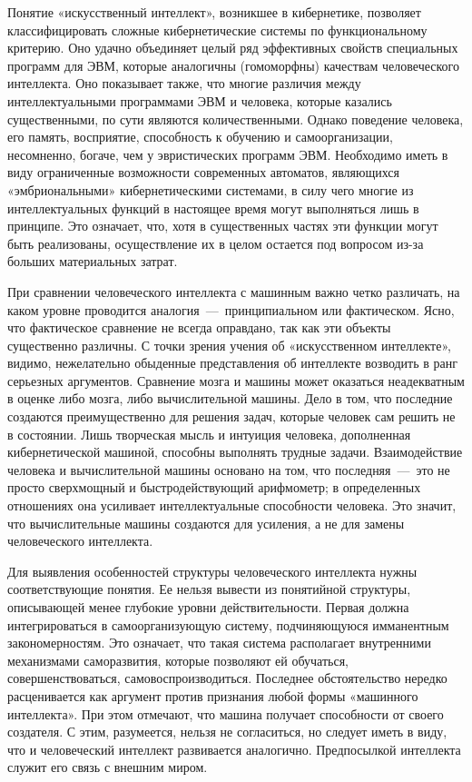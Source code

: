 \documentclass[14pt]{extarticle}
\begin{document}
Понятие «искусственный интеллект», возникшее в кибернетике, позволяет классифицировать сложные кибернетические системы по функциональному критерию. Оно удачно объединяет целый ряд эффективных свойств специальных программ для ЭВМ, которые аналогичны (гомоморфны) качествам человеческого интеллекта. Оно показывает также, что многие различия между интеллектуальными программами ЭВМ и человека, которые казались существенными, по сути являются количественными. Однако поведение человека, его память, восприятие, способность к обучению и самоорганизации, несомненно, богаче, чем у эвристических программ ЭВМ. Необходимо иметь в виду ограниченные возможности современных автоматов, являющихся «эмбриональными» кибернетическими системами, в силу чего многие из интеллектуальных функций в настоящее время могут выполняться лишь в принципе. Это означает, что, хотя в существенных частях эти функции могут быть реализованы, осуществление их в целом остается под вопросом из-за больших материальных затрат.

При сравнении человеческого интеллекта с машинным важно четко различать, на каком уровне проводится аналогия~---~принципиальном или фактическом. Ясно, что фактическое сравнение не всегда оправдано, так как эти объекты существенно различны. С точки зрения учения об «искусственном интеллекте», видимо, нежелательно обыденные представления об интеллекте возводить в ранг серьезных аргументов. Сравнение мозга и машины может оказаться неадекватным в оценке либо мозга, либо вычислительной машины. Дело в том, что последние создаются преимущественно для решения задач, которые человек сам решить не в состоянии. Лишь творческая мысль и интуиция человека, дополненная кибернетической машиной, способны выполнять трудные задачи. Взаимодействие человека и вычислительной машины основано на том, что последняя~---~это не просто сверхмощный и быстродействующий арифмометр; в определенных отношениях она усиливает интеллектуальные способности человека. Это значит, что вычислительные машины создаются для усиления, а не для замены человеческого интеллекта.

Для выявления особенностей структуры человеческого интеллекта нужны соответствующие понятия. Ее нельзя вывести из понятийной структуры, описывающей менее глубокие уровни действительности. Первая должна интегрироваться в самоорганизующую систему, подчиняющуюся имманентным закономерностям. Это означает, что такая система располагает внутренними механизмами саморазвития, которые позволяют ей обучаться, совершенствоваться, самовоспроизводиться. Последнее обстоятельство нередко расценивается как аргумент против признания любой формы «машинного интеллекта». При этом отмечают, что машина получает способности от своего создателя. С этим, разумеется, нельзя не согласиться, но следует иметь в виду, что и человеческий интеллект развивается аналогично. Предпосылкой интеллекта служит его связь с внешним миром.
\end{document}
